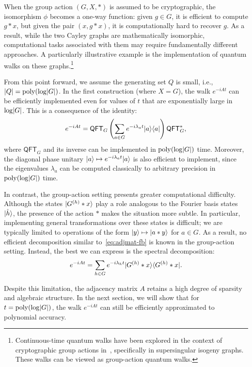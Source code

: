 \documentclass[11pt]{article}
\theoremstyle{definition}
\newcommand{\qft}{\mathsf{QFT}}
\begin{document}
    When the group action \( (G, X, *) \) is assumed to be cryptographic, the isomorphism \( \phi \) becomes a one-way function: given \( g \in G \), it is efficient to compute \( g * x \), but given the pair \( (x, g * x) \), it is computationally hard to recover \( g \). As a result, while the two Cayley graphs are mathematically isomorphic, computational tasks associated with them may require fundamentally different approaches. A particularly illustrative example is the implementation of quantum walks on these graphs.\footnote{Continuous-time quantum walks have been explored in the context of cryptographic group actions in~\cite{booher2024failing, doliskani2023sample}, specifically in supersingular isogeny graphs. These walks can be viewed as group-action quantum walks.}

    From this point forward, we assume the generating set \( Q \) is small, i.e., \( \lvert Q\rvert = \operatorname{poly}(\log \lvert G\rvert) \). In the first construction (where \( X = G \)), the walk \( e^{-iAt} \) can be efficiently implemented even for values of \( t \) that are exponentially large in \( \log \lvert G\rvert \). This is a consequence of the identity:
    \begin{equation}
        \label{eq:adjmat-fb}
        e^{-iAt} = \qft_G \left( \sum_{a \in G} e^{-i\lambda_a t} \ket{a} \bra{a} \right) \qft_G^*,
    \end{equation}
    where \( \qft_G \) and its inverse can be implemented in \( \operatorname{poly}(\log \lvert G\rvert) \) time. Moreover, the diagonal phase unitary \( \lvert a\rangle \mapsto e^{-i\lambda_a t} \lvert a\rangle \) is also efficient to implement, since the eigenvalues \( \lambda_a \) can be computed classically to arbitrary precision in \( \operatorname{poly}(\log \lvert G\rvert) \) time.

    In contrast, the group-action setting presents greater computational difficulty. Although the states \( \lvert G^{(h)} * x\rangle \) play a role analogous to the Fourier basis states \( \lvert\hat{h}\rangle \), the presence of the action \( * \) makes the situation more subtle. In particular, implementing general transformations over these states is difficult; we are typically limited to operations of the form \( \lvert y\rangle \mapsto \lvert a * y\rangle \) for \( a \in G \). As a result, no efficient decomposition similar to~\eqref{eq:adjmat-fb} is known in the group-action setting. Instead, the best we can express is the spectral decomposition:
    \[
    e^{-iAt} = \sum_{h \in G} e^{-i\lambda_h t} \lvert G^{(h)} * x\rangle \langle G^{(h)} * x\rvert.
    \]

    Despite this limitation, the adjacency matrix \( A \) retains a high degree of sparsity and algebraic structure. In the next section, we will show that for \( t = \operatorname{poly}(\log \lvert G\rvert) \), the walk \( e^{-iAt} \) can still be efficiently approximated to polynomial accuracy.
\end{document}
